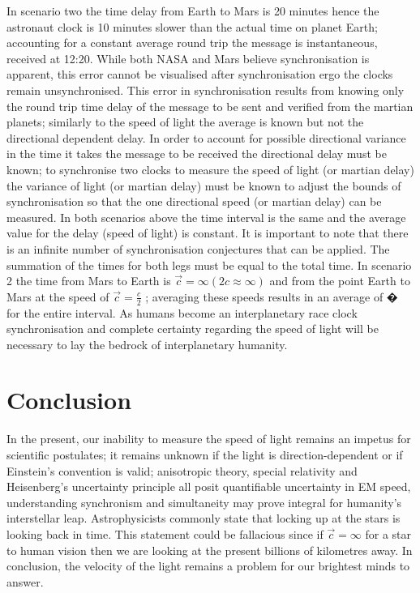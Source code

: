 \documentclass[12pt,letterpaper]{article}
\begin{document}
In scenario two the time delay from Earth to Mars is 20 minutes hence the astronaut clock is 10 minutes slower than the actual time on planet Earth; accounting for a constant average round trip the message is instantaneous, received at 12:20. While both NASA and Mars believe synchronisation is apparent, this error cannot be visualised after synchronisation ergo the clocks remain unsynchronised. This error in synchronisation results from knowing only the round trip time delay of the message to be sent and verified from the martian planets; similarly to the speed of light the average is known but not the directional dependent delay. In order to account for possible directional variance in the time it takes the message to be received the directional delay must be known; to synchronise two clocks to measure the speed of light (or martian delay) the variance of light (or martian delay) must be known to adjust the bounds of synchronisation so that the one directional speed (or martian delay) can be measured. In both scenarios above the time interval is the same and the average value for the delay (speed of light) is constant. It is important to note that there is an infinite number of synchronisation conjectures that can be applied. The summation of the times for both legs must be equal to the total time. In scenario 2 the time from Mars to Earth is $ \vec{c}= \infty (2c ≈ ∞)$ and from the point Earth to Mars at the speed of $\vec{c}= \frac{c}{2}$ ; averaging these speeds results in an average of � for the entire interval. As humans become an interplanetary race clock synchronisation and complete certainty regarding the speed of light will be necessary to lay the bedrock of interplanetary humanity. 
\section{Conclusion}
In the present, our inability to measure the speed of light remains an impetus for scientific postulates; it remains unknown if the light is direction-dependent or if Einstein's convention is valid; anisotropic theory, special relativity and Heisenberg's uncertainty principle all posit quantifiable uncertainty in EM speed, understanding synchronism and simultaneity may prove integral for humanity's interstellar leap. Astrophysicists commonly state that locking up at the stars is looking back in time. This statement could be fallacious since if $\vec{c}=\infty$ for a star to human vision then we are looking at the present billions of kilometres away. In conclusion, the velocity of the light remains a problem for our brightest minds to answer. 
\end{document}
